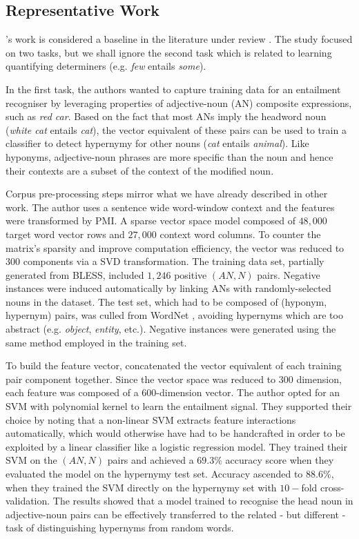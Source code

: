 \subsection{Representative Work} 
\citet{baroni2012entailment}'s work is considered a baseline in the literature under review \citep{shwartz2017siege, shwartz2016path, camacho2017we, roller2014inclusive, levy2015supervised}.  The study focused on two tasks, but we shall ignore the second task which is related to learning quantifying determiners (e.g. \textit{few} entails \textit{some}).  

In the first task, the authors wanted to capture training data for an entailment recogniser by leveraging properties of adjective-noun (AN) composite expressions, such as \textit{red car}.  Based on the fact that most ANs imply the headword noun (\textit{white cat} entails \textit{cat}), the vector equivalent of these pairs can be used to train a classifier to detect hypernymy for other nouns (\textit{cat} entails \textit{animal}).  Like hyponyms, adjective-noun phrases are more specific than the noun and hence their contexts are a subset of the context of the modified noun. 

Corpus pre-processing steps mirror what we have already described in other work.  The author uses a sentence wide word-window context and the features were transformed by \ac{PMI}.  A sparse vector space model composed of $48,000$ target word vector rows and $27,000$ context word columns.  To counter the matrix’s sparsity and improve computation efficiency, the vector was reduced to $300$ components via a \ac{SVD} transformation.  The training data set, partially generated from BLESS, included $1,246$ positive $(AN, N)$ pairs.  Negative instances were induced automatically by linking ANs with randomly-selected nouns in the dataset.  The test set, which had to be composed of (hyponym, hypernym) pairs, was culled from WordNet \citep{Miller1995}, avoiding hypernyms which are too abstract (e.g. \textit{object}, \textit{entity}, etc.).  Negative instances were generated using the same method employed in the training set.  

To build the feature vector, \citeauthor{baroni2012entailment} concatenated the vector equivalent of each training pair component together.  Since the vector space was reduced to $300$ dimension, each feature was composed of a $600$-dimension vector.  The author opted for an \ac{SVM} with polynomial kernel to learn the entailment signal.  They supported their choice by noting that a non-linear \ac{SVM} extracts feature interactions automatically, which would otherwise have had to be handcrafted in order to be exploited by a linear classifier like a logistic regression model.  They trained their \ac{SVM} on the $(AN, N)$ pairs and achieved a $69.3\%$ accuracy score when they evaluated the model on the hypernymy test set.  Accuracy ascended to $88.6\%$, when they trained the \ac{SVM} directly on the hypernymy set with $10-$fold cross-validation.  The results showed that a model trained to recognise the head noun in adjective-noun pairs can be effectively transferred to the related - but different - task of distinguishing hypernyms from random words.


